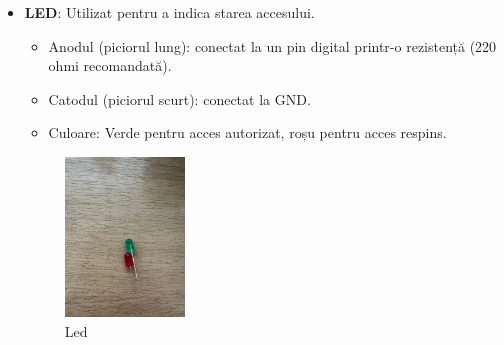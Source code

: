 \documentclass{report}
\begin{document}
\begin{itemize}
    \item \textbf{LED}: Utilizat pentru a indica starea accesului.
    \begin{itemize}
        \item Anodul (piciorul lung): conectat la un pin digital printr-o rezistență (220 ohmi recomandată).
        \item Catodul (piciorul scurt): conectat la GND.
        \item Culoare: Verde pentru acces autorizat, roșu pentru acces respins.
    \end{itemize}
    \begin{figure}[H]
    \centering
    \includegraphics[width=0.3\textwidth]{leds.jpg}
    \caption{Led}
    \label{fig:led}
\end{figure}
\newpage
\vspace*{1cm}


\end{itemize}
\end{document}
